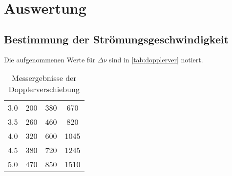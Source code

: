 \section{Auswertung}
\label{sec:Auswertung}



\subsection{Bestimmung der Strömungsgeschwindigkeit}
\label{ssec:aus1}

Die aufgenommenen Werte für $\Delta \nu$ sind in \autoref{tab:dopplerver} notiert. 

\begin{table}
    \centering
    \caption{Messergebnisse der Dopplerverschiebung}
    \begin{tabular}{S[table-format=1.1] S[table-format=3.0] S[table-format=3.0] S[table-format=4.0]}
        \toprule
         &  & &   \\
         & 200 & 380 & 670\\
        3.5 & 260 & 460 & 820\\
        4.0 & 320 & 600 & 1045\\
        4.5 & 380 & 720 & 1245\\
        5.0 & 470 & 850 & 1510\\
        \bottomrule
    \end{tabular}
    \label{tab:dopplerver}
\end{table}

